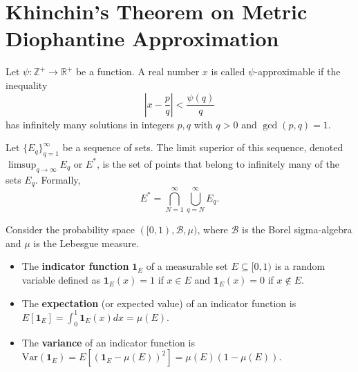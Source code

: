 \chapter{Khinchin's Theorem on Metric Diophantine Approximation}

\begin{definition}
    \label{def:psi-approximable}
    Let $\psi: \mathbb{Z}^+ \to \mathbb{R}^+$ be a function. A real number $x$ is called $\psi$-approximable if the inequality
    $$ \left|x - \frac{p}{q}\right| < \frac{\psi(q)}{q} $$
    has infinitely many solutions in integers $p, q$ with $q > 0$ and $\gcd(p,q)=1$.
\end{definition}

\begin{definition}
    \label{def:limsup_sets}
    Let $\{E_q\}_{q=1}^\infty$ be a sequence of sets. The limit superior of this sequence, denoted $\limsup_{q\to\infty} E_q$ or $E^*$, is the set of points that belong to infinitely many of the sets $E_q$. Formally,
    $$ E^* = \bigcap_{N=1}^{\infty} \bigcup_{q=N}^{\infty} E_q. $$
\end{definition}

\begin{definition}
    \label{def:Random_Variable_Expectation_Variance}
    Consider the probability space $([0,1), \mathcal{B}, \mu)$, where $\mathcal{B}$ is the Borel sigma-algebra and $\mu$ is the Lebesgue measure.
    \begin{itemize}
        \item The \textbf{indicator function} $\mathbf{1}_E$ of a measurable set $E \subseteq [0,1)$ is a random variable defined as $\mathbf{1}_E(x) = 1$ if $x \in E$ and $\mathbf{1}_E(x) = 0$ if $x \notin E$.
        \item The \textbf{expectation} (or expected value) of an indicator function is $E[\mathbf{1}_E] = \int_0^1 \mathbf{1}_E(x) dx = \mu(E)$.
        \item The \textbf{variance} of an indicator function is $\text{Var}(\mathbf{1}_E) = E[(\mathbf{1}_E - \mu(E))^2] = \mu(E)(1-\mu(E))$.
    \end{itemize}
\end{definition}


